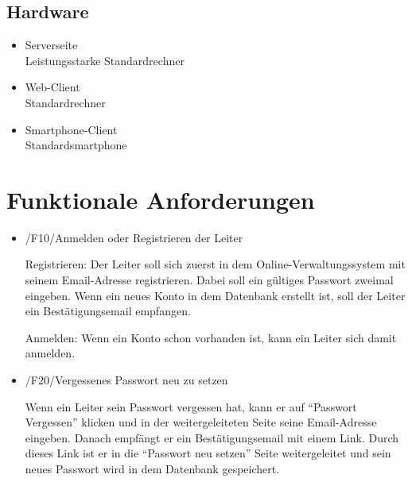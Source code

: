 \documentclass[a4paper]{scrreprt}
\begin{document}
        \section{Hardware}
            \begin{itemize}
                \item Serverseite\\
                    Leistungsstarke Standardrechner
                \item  Web-Client\\
                    Standardrechner
                \item Smartphone-Client\\
                    Standardsmartphone
            \end{itemize}

    \chapter{Funktionale Anforderungen}
 
        \begin{itemize}
            \item /F10/Anmelden oder Registrieren der Leiter
            	\par Registrieren: Der Leiter soll sich zuerst in dem Online-Verwaltungssystem mit seinem Email-Adresse registrieren. Dabei soll ein gültiges Passwort zweimal eingeben. Wenn ein neues Konto in dem Datenbank erstellt ist, soll der Leiter ein Bestätigungsemail empfangen.\par
Anmelden: Wenn ein Konto schon vorhanden ist, kann ein Leiter sich damit anmelden.
        \end{itemize}
        
        \begin{itemize}
            \item /F20/Vergessenes Passwort neu zu setzen
            	\par Wenn ein Leiter sein Passwort vergessen hat, kann er auf “Passwort Vergessen” klicken und in der weitergeleiteten Seite seine Email-Adresse eingeben. Danach empfängt er ein Bestätigungsemail mit einem Link. Durch dieses Link ist er in die “Passwort neu setzen” Seite weitergeleitet und sein neues Passwort wird in dem Datenbank gespeichert.

        \end{itemize}
        
\end{document}
